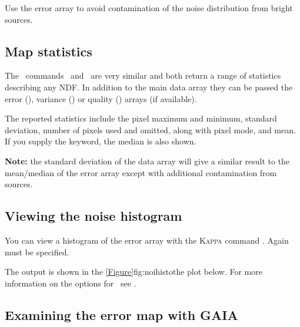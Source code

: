 \begin{tip}
  Use the error array to avoid contamination of the noise distribution
  from bright sources.
\end{tip}


\subsection{Map statistics}

The \Kappa\ commands \histat\ and \stats\ are very similar and both
return a range of statistics describing any NDF. In addition to the
main data array they can be passed the error (), variance
() or quality () arrays (if available).

The reported statistics include the pixel maximum and minimum,
standard deviation, number of pixels used and omitted, along with
pixel mode, and mean.  If you supply the  keyword,
the median is also shown.
\begin{terminalv}
\end{terminalv}

\textbf{Note:} the standard deviation of the data array will give a
similar result to the mean/median of the error array except with
additional contamination from sources.



\subsection{Viewing the noise histogram}

You can view a histogram of the error array with the
\textsc{Kappa} command \histogram. Again  must be
specified.

\begin{terminalv}
\end{terminalv}
The output is shown in the \cref{Figure}{fig:noihisto}{the plot below}.
For more information on the options for \histogram\ see
\kappasun.


\subsection{Examining the error map with GAIA}

